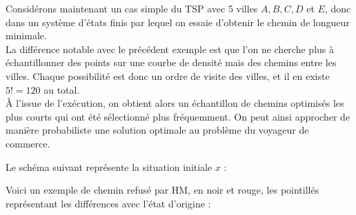 \documentclass{article}
\begin{document}
\begin{tcolorbox}[colback=white,colframe=yellow!80!black,title=Exemple 2, breakable]
Considérons maintenant un cas simple du TSP avec 5 villes $A, B, C, D$ et $E$, donc dans un système d'états finis par lequel on essaie d'obtenir le chemin de longueur minimale. \\
La différence notable avec le précédent exemple est que l'on ne cherche plus à échantillonner des points sur une courbe de densité mais des chemins entre les villes. Chaque possibilité est donc un ordre de visite des villes, et il en existe $5! = 120$ au total. \\
À l'issue de l'exécution, on obtient alors un échantillon de chemins optimisés les plus courts qui ont été sélectionné plus fréquemment. On peut ainsi approcher de manière probabiliste une solution optimale au problème du voyageur de commerce.

Le schéma suivant représente la situation initiale $x$ :
\begin{center}
\end{center}

Voici un exemple de chemin refusé par HM, en noir et rouge, les pointillés représentant les différences avec l'état d'origine :
\begin{center}
\end{center}


\end{tcolorbox}
\end{document}
